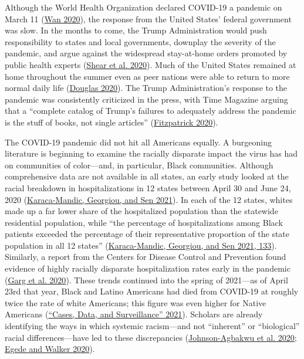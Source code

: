 \documentclass[
  12pt,
]{article}
\begin{document}
Although the World Health Organization declared COVID-19 a pandemic on March 11 (\protect\hyperlink{ref-Wan2020}{Wan 2020}), the response from the United States' federal government was slow. In the months to come, the Trump Administration would push responsibility to states and local governments, downplay the severity of the pandemic, and argue against the widespread stay-at-home orders promoted by public health experts (\protect\hyperlink{ref-Shear2020}{Shear et al. 2020}). Much of the United States remained at home throughout the summer even as peer nations were able to return to more normal daily life (\protect\hyperlink{ref-Douglas2020}{Douglas 2020}). The Trump Administration's response to the pandemic was consistently criticized in the press, with Time Magazine arguing that a ``complete catalog of Trump's failures to adequately address the pandemic is the stuff of books, not single articles'' (\protect\hyperlink{ref-Fitzpatrick2020}{Fitzpatrick 2020}).

The COVID-19 pandemic did not hit all Americans equally. A burgeoning literature is beginning to examine the racially disparate impact the virus has had on communities of color---and, in particular, Black communities. Although comprehensive data are not available in all states, an early study looked at the racial breakdown in hospitalizations in 12 states between April 30 and June 24, 2020 (\protect\hyperlink{ref-Karaca-Mandic2021}{Karaca-Mandic, Georgiou, and Sen 2021}). In each of the 12 states, whites made up a far lower share of the hospitalized population than the statewide residential population, while ``the percentage of hospitalizations among Black patients exceeded the percentage of their representative proportion of the state population in all 12 states'' (\protect\hyperlink{ref-Karaca-Mandic2021}{Karaca-Mandic, Georgiou, and Sen 2021, 133}). Similarly, a report from the Centers for Disease Control and Prevention found evidence of highly racially disparate hospitalization rates early in the pandemic (\protect\hyperlink{ref-Garg2020}{Garg et al. 2020}). These trends continued into the spring of 2021---as of April 23rd that year, Black and Latino Americans had died from COVID-19 at roughly twice the rate of white Americans; this figure was even higher for Native Americans (\protect\hyperlink{ref-cdc2021}{{``Cases, {Data}, and {Surveillance}''} 2021}). Scholars are already identifying the ways in which systemic racism---and not ``inherent'' or ``biological'' racial differences---have led to these discrepancies (\protect\hyperlink{ref-Johnson-Agbakwu2020}{Johnson-Agbakwu et al. 2020}; \protect\hyperlink{ref-Egede2020}{Egede and Walker 2020}).
\end{document}
